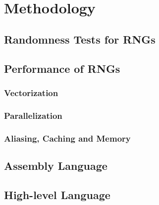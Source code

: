 \documentclass[crop=false]{standalone}
\begin{document}
  \section{Methodology} %
  \label{sec:methodology}
    \subsection{Randomness Tests for RNGs} %
    \label{sub:randomness_tests_for_rngs}


    \subsection{Performance of RNGs} %
    \label{sub:performance_of_rngs}
      \subsubsection{Vectorization} %
      \label{ssub:vectorization}

      \subsubsection{Parallelization} %
      \label{ssub:parallelization}

      \subsubsection{Aliasing, Caching and Memory} %
      \label{ssub:aliasing_caching_and_memory}


    \subsection{Assembly Language} %
    \label{sub:assembly_language}


    \subsection{High-level Language} %
    \label{sub:high_level_language}

\end{document}
